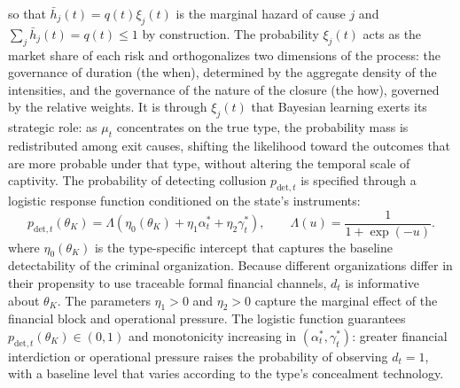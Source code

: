 \documentclass[review,authoryear,12pt]{elsarticle}
\theoremstyle{plain}
\theoremstyle{definition}
\newcommand{\1}{\mathbf{1}}
\begin{document}
so that $\bar h_j(t)=q(t)\xi_j(t)$ is the marginal hazard of cause $j$ and $\sum_j \bar h_j(t)=q(t)\leq 1$ by construction. The probability $\xi_j(t)$ acts as the market share of each risk and orthogonalizes two dimensions of the process: the governance of duration (the when), determined by the aggregate density of the intensities, and the governance of the nature of the closure (the how), governed by the relative weights. It is through $\xi_j(t)$ that Bayesian learning exerts its strategic role: as $\mu_t$ concentrates on the true type, the probability mass is redistributed among exit causes, shifting the likelihood toward the outcomes that are more probable under that type, without altering the temporal scale of captivity. The probability of detecting collusion $p_{\mathrm{det},t}$ is specified through a logistic response function conditioned on the state's instruments:
\begin{equation}
p_{\mathrm{det},t}(\theta_K)=\Lambda(\eta_0(\theta_K)+\eta_1\alpha_t^\ast+\eta_2\gamma_t^\ast),\qquad\Lambda(u)=\frac{1}{1+\exp(-u)}.
\label{eq:detection}
\end{equation}
where $\eta_0(\theta_K)$ is the type-specific intercept that captures the baseline detectability of the criminal organization. Because different organizations differ in their propensity to use traceable formal financial channels, $d_t$ is informative about $\theta_K$. The parameters $\eta_1>0$ and $\eta_2>0$ capture the marginal effect of the financial block and operational pressure. The logistic function guarantees $p_{\mathrm{det},t}(\theta_K)\in(0,1)$ and monotonicity increasing in $(\alpha_t^\ast,\gamma_t^\ast)$: greater financial interdiction or operational pressure raises the probability of observing $d_t=1$, with a baseline level that varies according to the type's concealment technology.
\end{document}
